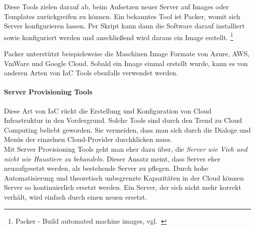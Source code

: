 Diese Tools zielen darauf ab, beim Aufsetzen neuer Server auf Images oder Templates zurückgreifen zu können.
Ein bekanntes Tool ist Packer, womit sich Server konfigurieren lassen.
Per Skript kann dann die Software darauf installiert sowie konfiguriert werden und anschließend wird daraus ein Image erstellt.
\footnote{Packer - Build automated machine images, vgl.~\cite{PACKER}}

Packer unterstützt beispielsweise die Maschinen Image Formate von Azure, AWS, VmWare und Google Cloud.
Sobald ein Image einmal erstellt wurde, kann es von anderen Arten von IaC Tools ebenfalls verwendet werden.

\paragraph{Server Provisioning Tools}

Diese Art von IaC rückt die Erstellung und Konfiguration von Cloud Infrastruktur in den Vordergrund.
Solche Tools sind durch den Trend zu Cloud Computing beliebt geworden.
Sie vermeiden, dass man sich durch die Dialoge und Menüs der einzelnen Cloud-Provider durchklicken muss. \\

Mit Server Provisioning Tools geht man eher dazu über, die \textsl{Server wie Vieh und nicht wie Haustiere zu behandeln}.
Dieser Ansatz meint, dass Server eher neuaufgesetzt werden, als bestehende Server zu pflegen.
Durch hohe Automatisierung und theoretisch unbegrenzte Kapazitäten in der Cloud können Server so kontinuierlich ersetzt werden.
Ein Server, der sich nicht mehr korrekt verhält, wird einfach durch einen neuen ersetzt.

